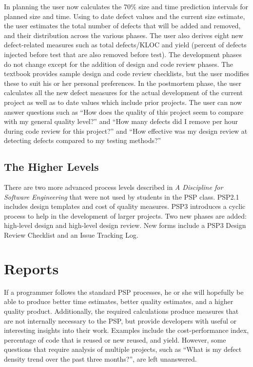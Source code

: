 \newpage
In planning the user now calculates the 70\% size and time prediction
intervals for planned size and time.  Using to date defect values and the
current size estimate, the user estimates the total number of defects that
will be added and removed, and their distribution across the various
phases.  The user also derives eight new defect-related measures such as
total defects/KLOC and yield (percent of defects injected before test that
are also removed before test).  The development phases do not change except
for the addition of design and code review phases.  The textbook provides
sample design and code review checklists, but the user modifies these to
suit his or her personal preferences.  In the postmortem phase, the user
calculates all the new defect measures for the actual development of the
current project as well as to date values which include prior projects.
The user can now answer questions such as ``How does the quality of this
project seem to compare with my general quality level?''  and ``How many
defects did I remove per hour during code review for this project?'' and
``How effective was my design review at detecting defects compared to my
testing methods?''

\subsection{The Higher Levels}
There are two more advanced process levels described in {\it A Discipline
  for Software Engineering} \cite{Humphrey95} that were not used by
students in the PSP class.  PSP2.1 includes design templates and cost of
quality measures.  PSP3 introduces a cyclic process to help in the
development of larger projects.  Two new phases are added: high-level
design and high-level design review.  New forms include a PSP3 Design
Review Checklist and an Issue Tracking Log.

\section{Reports}

If a programmer follows the standard PSP processes, he or she will
hopefully be able to produce better time estimates, better quality
estimates, and a higher quality product.  Additionally, the required
calculations produce measures that are not internally necessary to the PSP,
but provide developers with useful or interesting insights into their work.
Examples include the cost-performance index, percentage of code that is
reused or new reused, and yield.  However, some questions that require
analysis of multiple projects, such as ``What is my defect density trend
over the past three months?'', are left unanswered. \\

